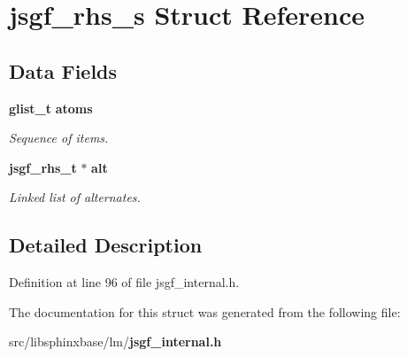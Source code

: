 \section{jsgf\-\_\-rhs\-\_\-s \-Struct \-Reference}
\label{structjsgf__rhs__s}
\subsection*{\-Data \-Fields}
\begin{DoxyCompactItemize}
\item 
{\bf glist\-\_\-t} {\bf atoms}\label{structjsgf__rhs__s_a53c517a31c83eb357764fb891bba7008}

\begin{DoxyCompactList}\small\item\em \-Sequence of items. \end{DoxyCompactList}\item 
{\bf jsgf\-\_\-rhs\-\_\-t} $\ast$ {\bf alt}\label{structjsgf__rhs__s_ad07cf44d48798d86633b37e9e6e67ff5}

\begin{DoxyCompactList}\small\item\em \-Linked list of alternates. \end{DoxyCompactList}\end{DoxyCompactItemize}


\subsection{\-Detailed \-Description}


\-Definition at line 96 of file jsgf\-\_\-internal.\-h.



\-The documentation for this struct was generated from the following file\-:\begin{DoxyCompactItemize}
\item 
src/libsphinxbase/lm/{\bf jsgf\-\_\-internal.\-h}\end{DoxyCompactItemize}
